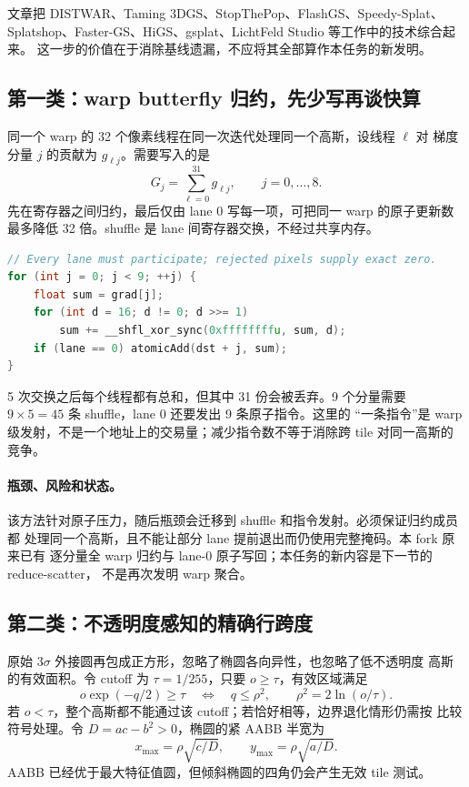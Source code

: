 文章把 DISTWAR、Taming 3DGS、StopThePop、FlashGS、Speedy-Splat、
Splatshop、Faster-GS、HiGS、gsplat、LichtFeld Studio 等工作中的技术综合起来。
这一步的价值在于消除基线遗漏，不应将其全部算作本任务的新发明。

\subsection{第一类：warp butterfly 归约，先少写再谈快算}

同一个 warp 的 32 个像素线程在同一次迭代处理同一个高斯，设线程 $\ell$ 对
梯度分量 $j$ 的贡献为 $g_{\ell j}$。需要写入的是
\begin{equation}
 G_j=\sum_{\ell=0}^{31}g_{\ell j},\qquad j=0,\ldots,8.
\end{equation}
先在寄存器之间归约，最后仅由 lane 0 写每一项，可把同一 warp 的原子更新数
最多降低 32 倍。shuffle 是 lane 间寄存器交换，不经过共享内存。

\begin{lstlisting}[language=C++,basicstyle=\ttfamily\small,breaklines=true]
// Every lane must participate; rejected pixels supply exact zero.
for (int j = 0; j < 9; ++j) {
    float sum = grad[j];
    for (int d = 16; d != 0; d >>= 1)
        sum += __shfl_xor_sync(0xffffffffu, sum, d);
    if (lane == 0) atomicAdd(dst + j, sum);
}
\end{lstlisting}

5 次交换之后每个线程都有总和，但其中 31 份会被丢弃。9 个分量需要
$9\times5=45$ 条 shuffle，lane 0 还要发出 9 条原子指令。这里的
``一条指令''是 warp 级发射，不是一个地址上的交易量；减少指令数不等于消除跨 tile
对同一高斯的竞争。

\paragraph{瓶颈、风险和状态。}
该方法针对原子压力，随后瓶颈会迁移到 shuffle 和指令发射。必须保证归约成员都
处理同一个高斯，且不能让部分 lane 提前退出而仍使用完整掩码。本 fork 原来已有
逐分量全 warp 归约与 lane-0 原子写回；本任务的新内容是下一节的 reduce-scatter，
不是再次发明 warp 聚合。

\subsection{第二类：不透明度感知的精确行跨度}

原始 $3\sigma$ 外接圆再包成正方形，忽略了椭圆各向异性，也忽略了低不透明度
高斯的有效面积。令 cutoff 为 $\tau=1/255$，只要 $o\geq\tau$，有效区域满足
\begin{equation}
 o\exp(-q/2)\geq\tau
 \quad\Longleftrightarrow\quad
 q\leq\rho^2,\qquad \rho^2=2\ln(o/\tau).
\end{equation}
若 $o<\tau$，整个高斯都不能通过该 cutoff；若恰好相等，边界退化情形仍需按
比较符号处理。令 $D=ac-b^2>0$，椭圆的紧 AABB 半宽为
\begin{equation}
 x_{\max}=\rho\sqrt{c/D},\qquad
 y_{\max}=\rho\sqrt{a/D}.
\end{equation}
AABB 已经优于最大特征值圆，但倾斜椭圆的四角仍会产生无效 tile 测试。

